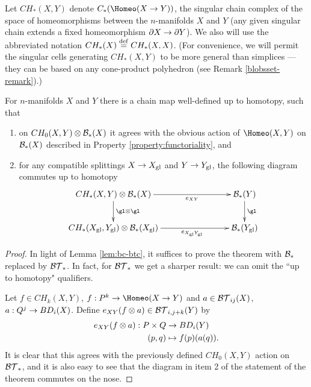 Let $CH_*(X, Y)$ denote $C_*(\Homeo(X \to Y))$, the singular chain complex of
the space of homeomorphisms
between the $n$-manifolds $X$ and $Y$ 
(any given singular chain extends a fixed homeomorphism $\partial X \to \partial Y$).
We also will use the abbreviated notation $CH_*(X) \stackrel{\mathrm{def}}{=} CH_*(X, X)$.
(For convenience, we will permit the singular cells generating $CH_*(X, Y)$ to be more general
than simplices --- they can be based on any cone-product polyhedron (see Remark \ref{blobsset-remark}).)

\begin{thm}  \label{thm:CH} \label{thm:evaluation}%
For $n$-manifolds $X$ and $Y$ there is a chain map
well-defined up to homotopy,
such that
\begin{enumerate}
\item on $CH_0(X, Y) \otimes {\mathcal B}_*(X)$ it agrees with the obvious action of 
$\Homeo(X, Y)$ on ${\mathcal B}_*(X)$  described in Property \ref{property:functoriality}, and
\item for any compatible splittings $X\to X_\mathrm{gl}$ and $Y\to Y_\mathrm{gl}$, 
the following diagram commutes up to homotopy
\begin{equation*}
\xymatrix@C+2cm{
      CH_*(X, Y) \otimes \bc_*(X)
        \ar[r]_(.6){e_{XY}}  \ar[d]^{\gl \otimes \gl}   &
            \bc_*(Y)\ar[d]^{\gl} \\
     CH_*(X\sgl, Y\sgl) \otimes \bc_*(X\sgl) \ar[r]_(.6){e_{X\sgl Y\sgl}}   & 	\bc_*(Y\sgl)  
}
\end{equation*}
\end{enumerate}
\end{thm}

\begin{proof}
In light of Lemma \ref{lem:bc-btc}, it suffices to prove the theorem with 
${\mathcal B}_*$ replaced by ${\mathcal{BT}}_*$.
In fact, for ${\mathcal{BT}}_*$ we get a sharper result: we can omit
the ``up to homotopy" qualifiers.

Let $f\in CH_k(X, Y)$, $f:P^k\to \Homeo(X \to Y)$ and $a\in {\mathcal{BT}}_{ij}(X)$, 
$a:Q^j \to BD_i(X)$.
Define $e_{XY}(f\otimes a)\in {\mathcal{BT}}_{i,j+k}(Y)$ by
\begin{align*}
	e_{XY}(f\otimes a) : P\times Q &\to BD_i(Y) \\
	(p,q) &\mapsto f(p)(a(q))  .
\end{align*}
It is clear that this agrees with the previously defined $CH_0(X, Y)$ action on ${\mathcal{BT}}_*$,
and it is also easy to see that the diagram in item 2 of the statement of the theorem
commutes on the nose.
\end{proof}


